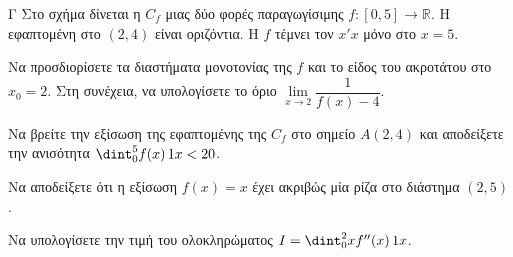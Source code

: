 \begin{thema}{Γ}
Στο σχήμα δίνεται η $C_f$ μιας δύο φορές παραγωγίσιμης $f:[0, 5]\to\mathbb{R}$. Η εφαπτομένη στο $(2, 4)$ είναι οριζόντια. Η $f$ τέμνει τον $x'x$ μόνο στο $x = 5$.

\begin{center}
\end{center}

\begin{erwthma}
  \item Να προσδιορίσετε τα διαστήματα μονοτονίας της $f$ και το είδος του ακροτάτου στο $x_0=2$. Στη συνέχεια, να υπολογίσετε το όριο $\lim\limits_{x \to 2} \dfrac{1}{f(x) - 4}$.
  \item Να βρείτε την εξίσωση της εφαπτομένης της $C_f$ στο σημείο $A(2, 4)$ και αποδείξετε την ανισότητα $\dint_0^5 f(x)\,\d x < 20$.
  \item Να αποδείξετε ότι η εξίσωση $f(x) = x$ έχει ακριβώς μία ρίζα στο διάστημα $(2, 5)$.
  \item Να υπολογίσετε την τιμή του ολοκληρώματος $I = \dint_0^2 x f''(x)\,\d x$.
\end{erwthma}
\end{thema}


